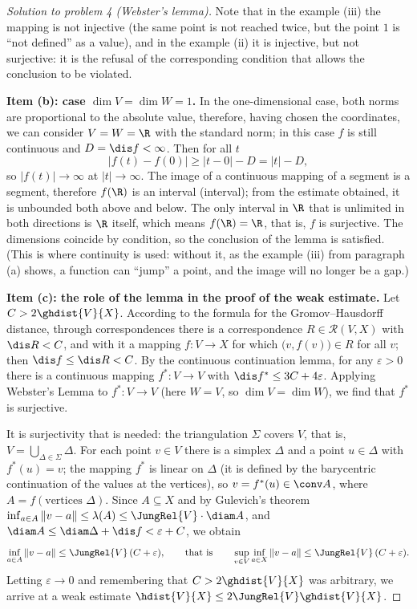 \documentclass[a4paper,12pt]{report}
\begin{document}
\begin{proof}[Solution to problem \textup{4} \textup{(}Webster's lemma\textup{)}]
Note that in the example \textup{(iii)} the mapping is not injective \textup{(}the same point is not reached twice, but the point $1$ is ``not defined'' as a value\textup{)}, and in the example \textup{(ii)} it is injective, but not surjective: it is the refusal of the corresponding condition that allows the conclusion to be violated.

\textbf{Item \textup{(b)}: case $\dim V = \dim W = 1$.} In the one-dimensional case, both norms are proportional to the absolute value, therefore, having chosen the coordinates, we can consider $V = W = \R$ with the standard norm; in this case $f$ is still continuous and $D = \dis f < \infty$. Then for all $t$
\[
|f(t) - f(0)| \ge |t - 0| - D = |t| - D,
\]
so $|f(t)| \to \infty$ at $|t| \to \infty$. The image of a continuous mapping of a segment is a segment, therefore $f(\R)$ is an interval \textup{(}interval\textup{)}; from the estimate obtained, it is unbounded both above and below. The only interval in $\R$ that is unlimited in both directions is $\R$ itself, which means $f(\R) = \R$, that is, $f$ is surjective. The dimensions coincide by condition, so the conclusion of the lemma is satisfied. \textup{(}This is where continuity is used: without it, as the example \textup{(iii)} from paragraph \textup{(a)} shows, a function can ``jump'' a point, and the image will no longer be a gap.\textup{)}

\textbf{Item \textup{(c)}: the role of the lemma in the proof of the weak estimate.} Let $C > 2\ghdist{V}{X}$. According to the formula for the Gromov--Hausdorff distance, through correspondences there is a correspondence $R \in \mathcal R(V,X)$ with $\dis R < C$, and with it a mapping $f\colon V \to X$ for which $\bigl(v, f(v)\bigr) \in R$ for all $v$; then $\dis f \le \dis R < C$. By the continuous continuation lemma, for any $\varepsilon > 0$ there is a continuous mapping $f^*\colon V \to V$ with $\dis f^* \le 3C + 4\varepsilon$. Applying Webster's Lemma to $f^*\colon V \to V$ \textup{(}here $W = V$, so $\dim V = \dim W$\textup{)}, we find that $f^*$ is surjective.

It is surjectivity that is needed: the triangulation $\Sigma$ covers $V$, that is, $V = \bigcup_{\Delta \in \Sigma}\Delta$. For each point $v \in V$ there is a simplex $\Delta$ and a point $u \in \Delta$ with $f^*(u) = v$; the mapping $f^*$ is linear on $\Delta$ \textup{(}it is defined by the barycentric continuation of the values at the vertices\textup{)}, so $v = f^*(u) \in \conv A$, where $A = f(\text{vertices }\Delta)$. Since $A \subseteq X$ and by Gulevich's theorem $\inf_{a \in A} \|v - a\| \le \lambda(A) \le \JungRel{V} \cdot \diam A$, and $\diam A \le \diam \Delta + \dis f < \varepsilon + C$, we obtain
\[
\inf_{a \in A} \|v - a\| \le \JungRel{V}\,(C + \varepsilon), \qquad \text{that is} \qquad \sup_{v \in V} \inf_{a \in X} \|v - a\| \le \JungRel{V}\,(C + \varepsilon).
\]
Letting $\varepsilon \to 0$ and remembering that $C > 2\ghdist{V}{X}$ was arbitrary, we arrive at a weak estimate $\hdist{V}{X} \le 2\JungRel{V} \ghdist{V}{X}$.

\end{proof}
\end{document}
